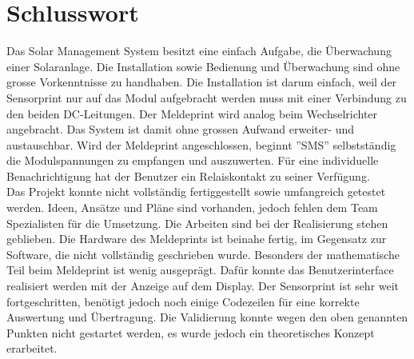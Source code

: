 \section{Schlusswort}
Das Solar Management System besitzt eine einfach Aufgabe, die Überwachung einer Solaranlage. Die Installation sowie Bedienung und Überwachung sind ohne grosse Vorkenntnisse zu handhaben. Die Installation ist darum einfach, weil der Sensorprint nur auf das Modul aufgebracht werden muss mit einer Verbindung zu den beiden DC-Leitungen. Der Meldeprint wird analog beim Wechselrichter angebracht. Das System ist damit ohne grossen Aufwand erweiter- und austauschbar. Wird der Meldeprint angeschlossen, beginnt ''SMS'' selbstständig die Modulspannungen zu empfangen und auszuwerten. Für eine individuelle Benachrichtigung hat der Benutzer ein Relaiskontakt zu seiner Verfügung.\\
Das Projekt konnte nicht vollständig fertiggestellt sowie umfangreich getestet werden. Ideen, Ansätze und Pläne sind vorhanden, jedoch fehlen dem Team Spezialisten für die Umsetzung. Die Arbeiten sind bei der Realisierung stehen geblieben. Die Hardware des Meldeprints ist beinahe fertig, im Gegensatz zur Software, die nicht vollständig geschrieben wurde. Besonders der mathematische Teil beim Meldeprint ist wenig ausgeprägt. Dafür konnte das Benutzerinterface realisiert werden mit der Anzeige auf dem Display. Der Sensorprint ist sehr weit fortgeschritten, benötigt jedoch noch einige Codezeilen für eine korrekte Auswertung und Übertragung. Die Validierung konnte wegen den oben genannten Punkten nicht gestartet werden, es wurde jedoch ein theoretisches Konzept erarbeitet.